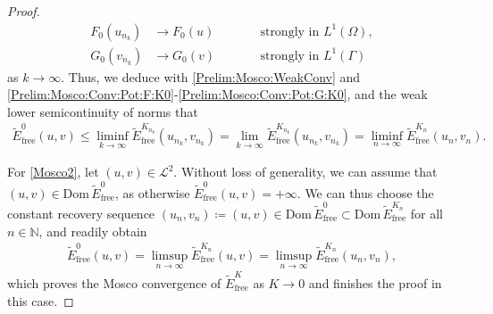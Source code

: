 \documentclass[10pt,a4paper]{amsart}
\newcommand{\Ga}{\Gamma}
\newcommand{\N}{\mathbb N}
\newcommand{\free}{\mathrm{free}}
\begin{document}
\begin{proof}
    \begin{subequations}
        \begin{alignat}{2}
            F_0(u_{n_k})&\rightarrow F_0(u) &&\qquad\text{strongly in~}L^1(\Omega), \label{Prelim:Mosco:Conv:Pot:F:K0}\\
            G_0(v_{n_k})&\rightarrow G_0(v) &&\qquad\text{strongly in~}L^1(\Ga)\label{Prelim:Mosco:Conv:Pot:G:K0}
        \end{alignat}
    \end{subequations}
    as $k\rightarrow\infty$. Thus, we deduce with \eqref{Prelim:Mosco:WeakConv} and \eqref{Prelim:Mosco:Conv:Pot:F:K0}-\eqref{Prelim:Mosco:Conv:Pot:G:K0}, and the weak lower semicontinuity of norms that
    \begin{align*}
        \widetilde E_\free^0(u,v) \leq \liminf_{k\rightarrow\infty} \widetilde E_\free^{K_{n_k}}(u_{n_k},v_{n_k}) = \lim_{k\rightarrow\infty} \widetilde E_\free^{K_{n_k}}(u_{n_k},v_{n_k}) = \liminf_{n\rightarrow\infty} \widetilde E_\free^{K_n}(u_n,v_n).
    \end{align*}
    
    For \ref{Mosco2}, let $(u,v)\in\mathcal{L}^2$. Without loss of generality, we can assume that $(u,v)\in\mathrm{Dom}\,\widetilde E_\free^0$, as otherwise $\widetilde E_\free^0(u,v) = +\infty$. We can thus choose the constant recovery sequence $(u_n,v_n)\coloneqq (u,v)\in \mathrm{Dom}\,\widetilde E_\free^0\subset \mathrm{Dom}\,\widetilde E_\free^{K_n}$ for all $n\in\N$, and readily obtain
    \begin{align*}
        \widetilde E_\free^0(u,v) = \limsup_{n\rightarrow\infty} \widetilde E_\free^{K_n}(u,v) = \limsup_{n\rightarrow\infty} \widetilde E_\free^{K_n}(u_n,v_n),
    \end{align*}
    which proves the Mosco convergence of $\widetilde E_\free^K$ as $K\rightarrow 0$ and finishes the proof in this case.


\end{proof}
\end{document}
